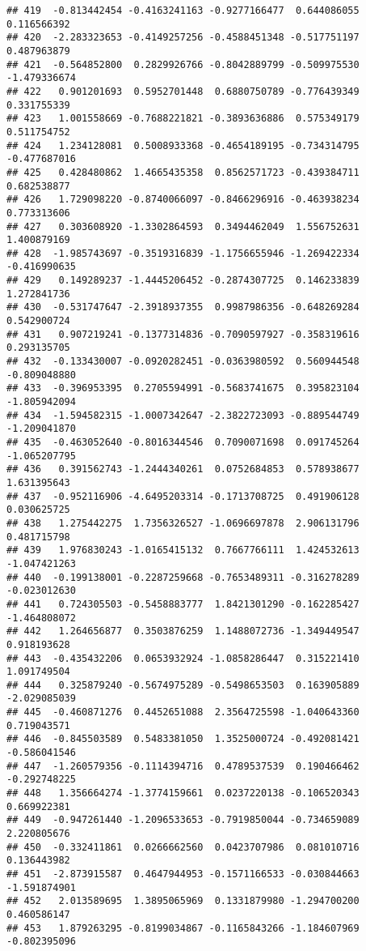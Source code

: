 \documentclass[
]{article}
\begin{document}
\begin{verbatim}
## 419  -0.813442454 -0.4163241163 -0.9277166477  0.644086055  0.116566392
## 420  -2.283323653 -0.4149257256 -0.4588451348 -0.517751197  0.487963879
## 421  -0.564852800  0.2829926766 -0.8042889799 -0.509975530 -1.479336674
## 422   0.901201693  0.5952701448  0.6880750789 -0.776439349  0.331755339
## 423   1.001558669 -0.7688221821 -0.3893636886  0.575349179  0.511754752
## 424   1.234128081  0.5008933368 -0.4654189195 -0.734314795 -0.477687016
## 425   0.428480862  1.4665435358  0.8562571723 -0.439384711  0.682538877
## 426   1.729098220 -0.8740066097 -0.8466296916 -0.463938234  0.773313606
## 427   0.303608920 -1.3302864593  0.3494462049  1.556752631  1.400879169
## 428  -1.985743697 -0.3519316839 -1.1756655946 -1.269422334 -0.416990635
## 429   0.149289237 -1.4445206452 -0.2874307725  0.146233839  1.272841736
## 430  -0.531747647 -2.3918937355  0.9987986356 -0.648269284  0.542900724
## 431   0.907219241 -0.1377314836 -0.7090597927 -0.358319616  0.293135705
## 432  -0.133430007 -0.0920282451 -0.0363980592  0.560944548 -0.809048880
## 433  -0.396953395  0.2705594991 -0.5683741675  0.395823104 -1.805942094
## 434  -1.594582315 -1.0007342647 -2.3822723093 -0.889544749 -1.209041870
## 435  -0.463052640 -0.8016344546  0.7090071698  0.091745264 -1.065207795
## 436   0.391562743 -1.2444340261  0.0752684853  0.578938677  1.631395643
## 437  -0.952116906 -4.6495203314 -0.1713708725  0.491906128  0.030625725
## 438   1.275442275  1.7356326527 -1.0696697878  2.906131796  0.481715798
## 439   1.976830243 -1.0165415132  0.7667766111  1.424532613 -1.047421263
## 440  -0.199138001 -0.2287259668 -0.7653489311 -0.316278289 -0.023012630
## 441   0.724305503 -0.5458883777  1.8421301290 -0.162285427 -1.464808072
## 442   1.264656877  0.3503876259  1.1488072736 -1.349449547  0.918193628
## 443  -0.435432206  0.0653932924 -1.0858286447  0.315221410  1.091749504
## 444   0.325879240 -0.5674975289 -0.5498653503  0.163905889 -2.029085039
## 445  -0.460871276  0.4452651088  2.3564725598 -1.040643360  0.719043571
## 446  -0.845503589  0.5483381050  1.3525000724 -0.492081421 -0.586041546
## 447  -1.260579356 -0.1114394716  0.4789537539  0.190466462 -0.292748225
## 448   1.356664274 -1.3774159661  0.0237220138 -0.106520343  0.669922381
## 449  -0.947261440 -1.2096533653 -0.7919850044 -0.734659089  2.220805676
## 450  -0.332411861  0.0266662560  0.0423707986  0.081010716  0.136443982
## 451  -2.873915587  0.4647944953 -0.1571166533 -0.030844663 -1.591874901
## 452   2.013589695  1.3895065969  0.1331879980 -1.294700200  0.460586147
## 453   1.879263295 -0.8199034867 -0.1165843266 -1.184607969 -0.802395096

\end{verbatim}
\end{document}
